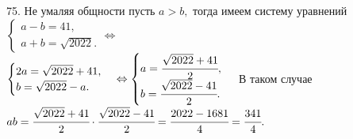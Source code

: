 75. Не умаляя общности пусть $a>b,$ тогда имеем систему уравнений $\begin{cases} a-b=41,\\ a+b=\sqrt{2022}.\end{cases}\Leftrightarrow$\\$ \begin{cases} 2a=\sqrt{2022}+41,\\ b=\sqrt{2022}-a.\end{cases}\Leftrightarrow\begin{cases} a=\cfrac{\sqrt{2022}+41}{2},\\ b=\cfrac{\sqrt{2022}-41}{2}.\end{cases}$ В таком случае $ab=\cfrac{\sqrt{2022}+41}{2}\cdot\cfrac{\sqrt{2022}-41}{2}=\cfrac{2022-1681}{4}=\cfrac{341}{4}.$\\
